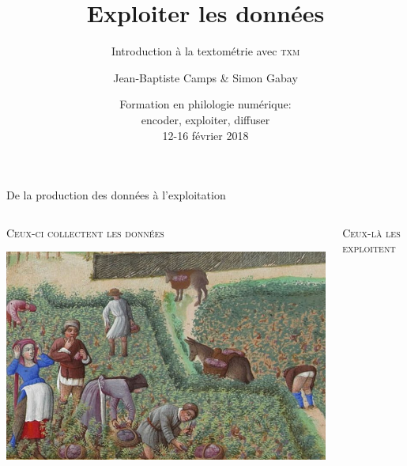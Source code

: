 \documentclass{beamer}
\institute{Univ. de Neuchâtel}
\title{Exploiter les données}
\subtitle{Introduction à la textométrie avec \textsc{txm}}
\author{Jean-Baptiste Camps \& Simon Gabay}
\date[FoPhil -- 14 févr. 2018]{Formation en philologie numérique:\\ encoder, exploiter, diffuser\\
12-16 février 2018}
\begin{document}
\maketitle
  

\begin{frame}{De la production des données à l'exploitation}
	
	\begin{columns}[T]
		
		\begin{column}{0.62\textwidth}
			
			\textsc{Ceux-ci collectent les données}
			
			\centering
			
			\includegraphics[width=\textwidth]{img/vendange.jpg}
			
		\end{column}
			\begin{column}{0.38\textwidth}
		
		\textsc{Ceux-là les exploitent}
		
		\centering
		

\end{column}
\end{columns}
\end{frame}
\end{document}
